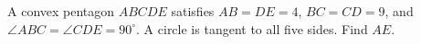 A convex pentagon $ABCDE$ satisfies $AB=DE=4$, $BC=CD=9$, and $\angle ABC=\angle CDE=90^\circ$. A circle is tangent to all five sides. Find $AE$.

